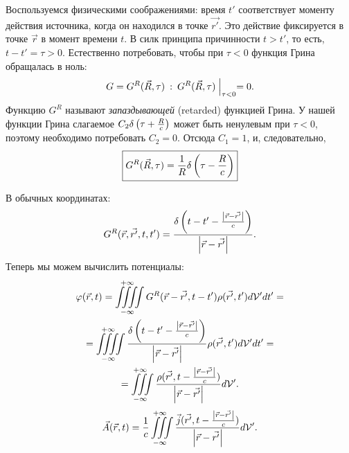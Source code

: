     Воспользуемся физическими соображениями: время $t'$ соответствует моменту действия источника, когда он находился в точке $\vec{r'}$.
    Это действие фиксируется в точке $\vec{r}$ в момент времени $t$. В силк принципа причинности $t > t'$, то есть,
    $t - t' = \tau > 0$. Естественно потребовать, чтобы при $\tau < 0$ функция Грина обращалась в ноль:
    \[
        G = G^R(\vec{R}, \tau) \: : \: G^R(\vec{R}, \tau)\Bigm|_{\tau < 0} = 0.
    \]
    Функцию $G^R$ называют \textit{запаздывающей} (retarded) функцией Грина.
    У нашей функции Грина слагаемое $C_2\delta\left({\tau + \frac Rc}\right)$ может быть ненулевым при $\tau < 0$,
    поэтому необходимо потребовать $C_2 = 0$. Отсюда $C_1 = 1$, и, следовательно,
    \begin{equation}
        \boxed{G^R(\vec{R}, \tau) = \frac 1R \delta\left({\tau - \frac Rc}\right)} \label{Retarded_func}
    \end{equation}

    В обычных координатах:
    \[
        G^R(\vec{r}, \vec{r'}, t, t') = \frac{\delta\left({t - t' - \frac{\left|{\vec{r} - \vec{r'}}\right|}{c}}\right)}{\left|{\vec{r} - \vec{r'}}\right|}.
    \]
    Теперь мы можем вычислить потенциалы:
    \begin{gather*}
        \varphi(\vec{r}, t) = \iiiint\limits_{-\infty}^{+\infty} G^R(\vec{r} - \vec{r'}, t - t')\rho(\vec{r'}, t')d\mathcal{V}'dt' = \\ =
        \iiiint\limits_{-\infty}^{+\infty} \frac{\delta\left({t - t' - \frac{\left|{\vec{r} - \vec{r'}}\right|}{c}}\right)}{\left|{\vec{r} - \vec{r'}}\right|}\rho(\vec{r'}, t')d\mathcal{V}'dt' = \\ =
        \iiint\limits_{-\infty}^{+\infty} \frac{\rho(\vec{r'}, t - \frac{\left|{\vec{r} - \vec{r'}}\right|}{c})}{\left|{\vec{r} - \vec{r'}}\right|}d\mathcal{V}'.
    \end{gather*}
    \begin{equation}
        \vec{A}(\vec{r}, t) = \frac 1c \iiint\limits_{-\infty}^{+\infty} \frac{\vec{j}(\vec{r'}, t - \frac{\left|{\vec{r} - \vec{r'}}\right|}{c})}{\left|{\vec{r} - \vec{r'}}\right|}d\mathcal{V}'. \label{RetardedPotent}
    \end{equation}
    
